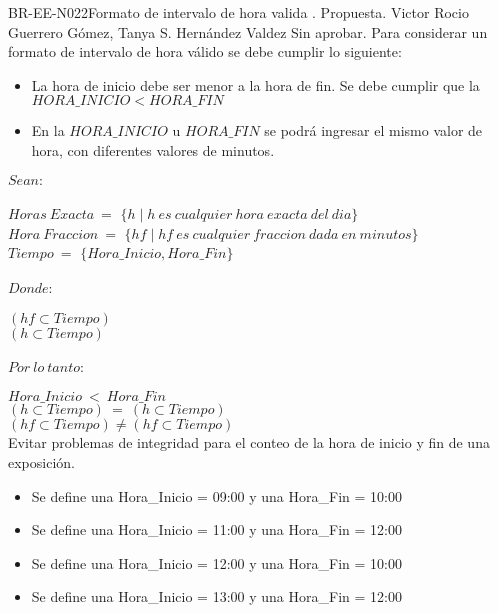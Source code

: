 \begin{BusinessRule}{BR-EE-N022}{Formato de intervalo de hora valida}
	{\bcIntegridad}    %
	{\btEnabler}     %
	{\blControlling}    %
	.
	\BRItem[Estado] Propuesta.
	 Victor
	 Rocio Guerrero Gómez, Tanya S. Hernández Valdez
	 Sin aprobar.
	\BRItem[Descripción] Para considerar un formato de intervalo de hora válido se debe cumplir lo siguiente:
	\begin{itemize}
		\item La hora de inicio debe ser menor a la hora de fin. Se debe cumplir que la $HORA\_INICIO < HORA\_FIN$
		\item En la $HORA\_INICIO$ u $HORA\_FIN$ se podrá ingresar el mismo valor de hora, con diferentes valores de minutos.
	\end{itemize}
	\BRItem[Sentencia] $Sean:$\\\\
	$Horas\ Exacta\ =$ $\{h \mid h\ es\ cualquier\ hora\ exacta\ del\ dia\}$ \\
	$Hora\ Fraccion\ =$ $\{hf \mid hf\ es\ cualquier\ fraccion\ dada\ en\ minutos\}$\\
	$Tiempo\ =$ $\{Hora\_Inicio, Hora\_Fin\}$ \\\\
	$Donde:$\\\\
	$(hf \subset Tiempo)$ \\
	$(h \subset Tiempo)$\\\\
	$Por\ lo\ tanto:$\\\\
	$Hora\_Inicio\ <\ Hora\_Fin$\\
	$(h \subset Tiempo)\ =\ (h \subset Tiempo)$\\
	$(hf \subset Tiempo) \neq (hf \subset Tiempo)$\\
	\BRItem[Motivación] Evitar problemas de integridad para el conteo de la hora de inicio y fin de una exposición.
	 \cdtEmpty
		\begin{itemize}
			\item Se define una Hora\_Inicio = 09:00 y una Hora\_Fin = 10:00
			\item Se define una Hora\_Inicio = 11:00 y una Hora\_Fin = 12:00
		\end{itemize}
	 \cdtEmpty
		\begin{itemize}
			\item Se define una Hora\_Inicio = 12:00 y una Hora\_Fin = 10:00
			\item Se define una Hora\_Inicio = 13:00 y una Hora\_Fin = 12:00
		\end{itemize}
\end{BusinessRule}

